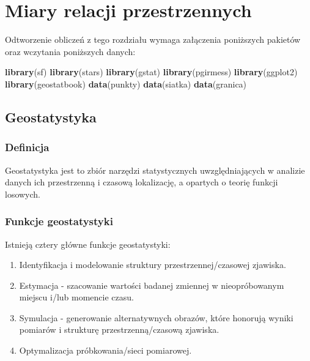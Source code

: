 \documentclass[
  paper=6in:9in,pagesize=pdftex,headinclude=on,footinclude=on,10pt]{scrbook}
\newenvironment{Shaded}{\begin{snugshade}}{\end{snugshade}}
\newcommand{\FunctionTok}[1]{\textcolor[rgb]{0.13,0.29,0.53}{\textbf{#1}}}
\newcommand{\NormalTok}[1]{#1}
\providecommand{\tightlist}{%
  \setlength{\itemsep}{0pt}\setlength{\parskip}{0pt}}
\begin{document}
\chapter{Miary relacji przestrzennych}\label{geostatystyka-prolog}

Odtworzenie obliczeń z tego rozdziału wymaga załączenia poniższych pakietów oraz wczytania poniższych danych:

\begin{Shaded}
\begin{Highlighting}[]
\FunctionTok{library}\NormalTok{(sf)}
\FunctionTok{library}\NormalTok{(stars)}
\FunctionTok{library}\NormalTok{(gstat)}
\FunctionTok{library}\NormalTok{(pgirmess)}
\FunctionTok{library}\NormalTok{(ggplot2)}
\FunctionTok{library}\NormalTok{(geostatbook)}
\FunctionTok{data}\NormalTok{(punkty)}
\FunctionTok{data}\NormalTok{(siatka)}
\FunctionTok{data}\NormalTok{(granica)}
\end{Highlighting}
\end{Shaded}

\section{Geostatystyka}\label{geostatystyka}

\subsection{Definicja}\label{definicja}

Geostatystyka jest to zbiór narzędzi statystycznych uwzględniających w analizie danych ich przestrzenną i czasową lokalizację, a opartych o teorię funkcji losowych.

\subsection{Funkcje geostatystyki}\label{funkcje-geostatystyki}

Istnieją cztery główne funkcje geostatystyki:

\begin{enumerate}
\def\labelenumi{\arabic{enumi}.}
\tightlist
\item
  Identyfikacja i modelowanie struktury przestrzennej/czasowej zjawiska.
\item
  Estymacja - szacowanie wartości badanej zmiennej w nieopróbowanym miejscu i/lub momencie czasu.
\item
  Symulacja - generowanie alternatywnych obrazów, które honorują wyniki pomiarów i strukturę przestrzenną/czasową zjawiska.
\item
  Optymalizacja próbkowania/sieci pomiarowej.
\end{enumerate}
\end{document}
